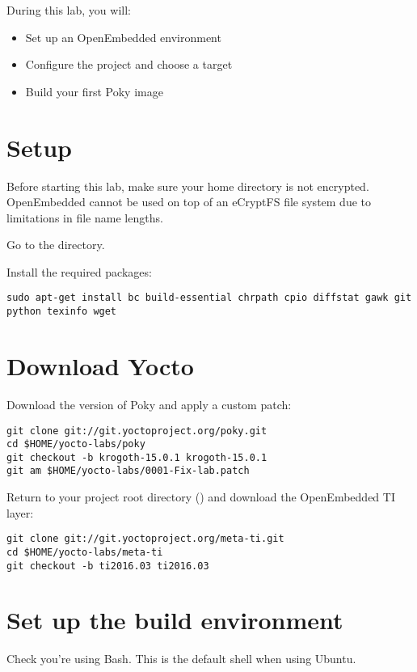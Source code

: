 
During this lab, you will:
\begin{itemize}
  \item Set up an OpenEmbedded environment
  \item Configure the project and choose a target
  \item Build your first Poky image
\end{itemize}

\section{Setup}

Before starting this lab, make sure your home directory is not
encrypted. OpenEmbedded cannot be used on top of an eCryptFS file
system due to limitations in file name lengths.

Go to the  directory.

Install the required packages:
\begin{verbatim}
sudo apt-get install bc build-essential chrpath cpio diffstat gawk git python texinfo wget
\end{verbatim}

\section{Download Yocto}

Download the  version of Poky and apply a custom patch:
\begin{verbatim}
git clone git://git.yoctoproject.org/poky.git
cd $HOME/yocto-labs/poky
git checkout -b krogoth-15.0.1 krogoth-15.0.1
git am $HOME/yocto-labs/0001-Fix-lab.patch
\end{verbatim}

Return to your project root directory ()
and download the OpenEmbedded TI layer:
\begin{verbatim}
git clone git://git.yoctoproject.org/meta-ti.git
cd $HOME/yocto-labs/meta-ti
git checkout -b ti2016.03 ti2016.03
\end{verbatim}

\section{Set up the build environment}

Check you're using Bash. This is the default shell when using Ubuntu.

